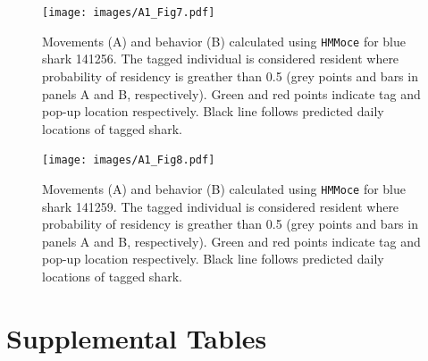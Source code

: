 \begin{figure}[p]
\centering
\texttt{[image: images/A1\_Fig7.pdf]}
\caption{Movements (A) and behavior (B) calculated
using \texttt{HMMoce} for blue shark 141256. The tagged individual is
considered resident where probability of residency is greather than 0.5
(grey points and bars in panels A and B, respectively). Green and red
points indicate tag and pop-up location respectively. Black line follows
predicted daily locations of tagged shark.}
\label{fig:a1f7}
\end{figure}

\begin{figure}[p]
\centering
\texttt{[image: images/A1\_Fig8.pdf]}
\caption{Movements (A) and behavior (B) calculated
using \texttt{HMMoce} for blue shark 141259. The tagged individual is
considered resident where probability of residency is greather than 0.5
(grey points and bars in panels A and B, respectively). Green and red
points indicate tag and pop-up location respectively. Black line follows
predicted daily locations of tagged shark.}
\label{fig:a1f8}
\end{figure}

\section{Supplemental Tables}

